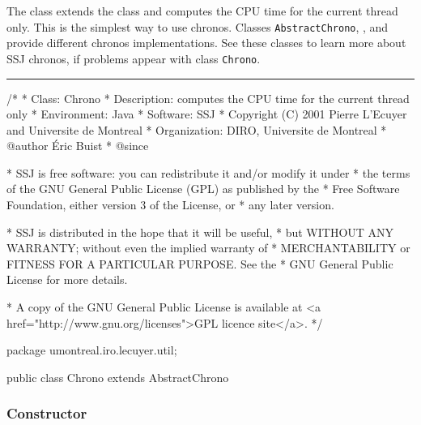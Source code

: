 
The  class extends the 
class and computes the CPU time for the current thread only.
This is the simplest way to use chronos. Classes \texttt{AbstractChrono},
, 
 and 
provide different chronos implementations.
See these classes to learn more about SSJ chronos, if problems appear with
class \texttt{Chrono}.

\bigskip\hrule
\begin{code}
\begin{hide}
/*
 * Class:        Chrono
 * Description:  computes the CPU time for the current thread only
 * Environment:  Java
 * Software:     SSJ 
 * Copyright (C) 2001  Pierre L'Ecuyer and Universite de Montreal
 * Organization: DIRO, Universite de Montreal
 * @author       Éric Buist
 * @since

 * SSJ is free software: you can redistribute it and/or modify it under
 * the terms of the GNU General Public License (GPL) as published by the
 * Free Software Foundation, either version 3 of the License, or
 * any later version.

 * SSJ is distributed in the hope that it will be useful,
 * but WITHOUT ANY WARRANTY; without even the implied warranty of
 * MERCHANTABILITY or FITNESS FOR A PARTICULAR PURPOSE.  See the
 * GNU General Public License for more details.

 * A copy of the GNU General Public License is available at
   <a href="http://www.gnu.org/licenses">GPL licence site</a>.
 */
\end{hide}
package umontreal.iro.lecuyer.util;


public class Chrono extends AbstractChrono \begin{hide} {
   private ThreadCPUTimeChrono chrono = new ThreadCPUTimeChrono();

   protected void getTime (long[] tab) {
         chrono.getTime(tab);
   }\end{hide}
\end{code}

\subsubsection*{Constructor}

